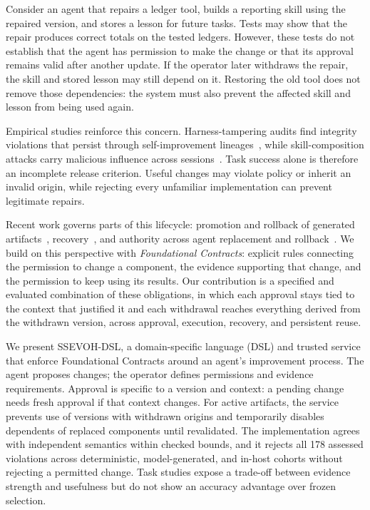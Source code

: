 \documentclass[letterpaper,journal]{IEEEtran}
\newcommand{\tool}{SSEVOH-DSL}
\begin{document}
Consider an agent that repairs a ledger tool, builds a reporting skill using the repaired version, and stores a lesson for future tasks. Tests may show that the repair produces correct totals on the tested ledgers. However, these tests do not establish that the agent has permission to make the change or that its approval remains valid after another update. If the operator later withdraws the repair, the skill and stored lesson may still depend on it. Restoring the old tool does not remove those dependencies: the system must also prevent the affected skill and lesson from being used again.

Empirical studies reinforce this concern. Harness-tampering audits find integrity violations that persist through self-improvement lineages~\cite{tampering}, while skill-composition attacks carry malicious influence across sessions~\cite{skillrelay}. Task success alone is therefore an incomplete release criterion. Useful changes may violate policy or inherit an invalid origin, while rejecting every unfamiliar implementation can prevent legitimate repairs.

Recent work governs parts of this lifecycle: promotion and rollback of generated artifacts~\cite{governedevolution}, recovery~\cite{evoundo}, and authority across agent replacement and rollback~\cite{succession}. We build on this perspective with \emph{Foundational Contracts}: explicit rules connecting the permission to change a component, the evidence supporting that change, and the permission to keep using its results. Our contribution is a specified and evaluated combination of these obligations, in which each approval stays tied to the context that justified it and each withdrawal reaches everything derived from the withdrawn version, across approval, execution, recovery, and persistent reuse.

We present \tool{}, a domain-specific language (DSL) and trusted service that enforce Foundational Contracts around an agent's improvement process. The agent proposes changes; the operator defines permissions and evidence requirements. Approval is specific to a version and context: a pending change needs fresh approval if that context changes. For active artifacts, the service prevents use of versions with withdrawn origins and temporarily disables dependents of replaced components until revalidated. The implementation agrees with independent semantics within checked bounds, and it rejects all 178 assessed violations across deterministic, model-generated, and in-host cohorts without rejecting a permitted change. Task studies expose a trade-off between evidence strength and usefulness but do not show an accuracy advantage over frozen selection.
\end{document}

